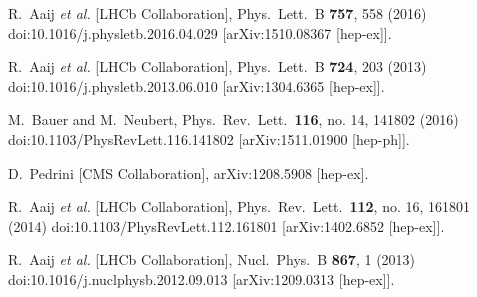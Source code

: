 \documentclass{PoS}
\begin{document}
\begin{thebibliography}{99}
  R.~Aaij {\it et al.} [LHCb Collaboration],
  Phys.\ Lett.\ B {\bf 757}, 558 (2016)
  doi:10.1016/j.physletb.2016.04.029
  [arXiv:1510.08367 [hep-ex]].


  R.~Aaij {\it et al.} [LHCb Collaboration],
  Phys.\ Lett.\ B {\bf 724}, 203 (2013)
  doi:10.1016/j.physletb.2013.06.010
  [arXiv:1304.6365 [hep-ex]].
 
  M.~Bauer and M.~Neubert,
  Phys.\ Rev.\ Lett.\  {\bf 116}, no. 14, 141802 (2016)
  doi:10.1103/PhysRevLett.116.141802
  [arXiv:1511.01900 [hep-ph]].

 

  D.~Pedrini [CMS Collaboration],
  arXiv:1208.5908 [hep-ex].


  R.~Aaij {\it et al.} [LHCb Collaboration],
  Phys.\ Rev.\ Lett.\  {\bf 112}, no. 16, 161801 (2014)
  doi:10.1103/PhysRevLett.112.161801
  [arXiv:1402.6852 [hep-ex]].


  R.~Aaij {\it et al.} [LHCb Collaboration],
  Nucl.\ Phys.\ B {\bf 867}, 1 (2013)
  doi:10.1016/j.nuclphysb.2012.09.013
  [arXiv:1209.0313 [hep-ex]].
  
  
  
\end{thebibliography}
\end{document}
